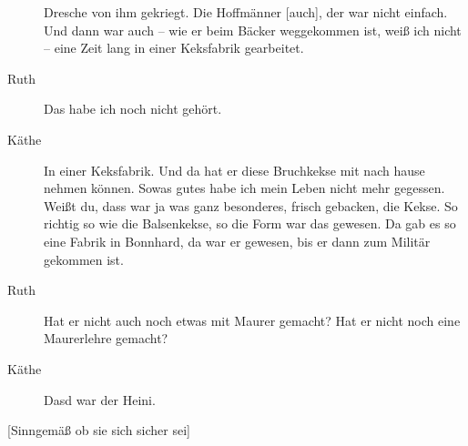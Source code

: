 \documentclass[ngerman,]{article}
\begin{document}
\begin{multicols}{2}
\begin{description}
Dresche von ihm gekriegt. Die Hoffmänner {[}auch{]}, der war nicht
einfach. Und dann war auch – wie er beim Bäcker weggekommen ist, weiß
ich nicht – eine Zeit lang in einer Keksfabrik gearbeitet.
\item[Ruth]
Das habe ich noch nicht gehört.
\item[Käthe]
In einer Keksfabrik. Und da hat er diese Bruchkekse mit nach hause
nehmen können. Sowas gutes habe ich mein Leben nicht mehr gegessen.
Weißt du, dass war ja was ganz besonderes, frisch gebacken, die Kekse.
So richtig so wie die Balsenkekse, so die Form war das gewesen. Da gab
es so eine Fabrik in Bonnhard, da war er gewesen, bis er dann zum
Militär gekommen ist.
\item[Ruth]
Hat er nicht auch noch etwas mit Maurer gemacht? Hat er nicht noch eine
Maurerlehre gemacht?
\item[Käthe]
Dasd war der Heini.
\end{description}

{[}Sinngemäß ob sie sich sicher sei{]}


\end{multicols}
\end{document}
